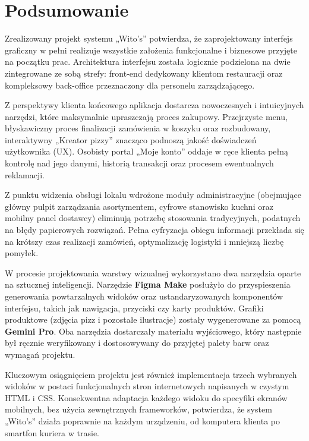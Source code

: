 \chapter{Podsumowanie}

Zrealizowany projekt systemu „Wito’s” potwierdza, że zaprojektowany interfejs graficzny w pełni realizuje wszystkie założenia funkcjonalne i biznesowe przyjęte na początku prac. Architektura interfejsu została logicznie podzielona na dwie zintegrowane ze sobą strefy: front-end dedykowany klientom restauracji oraz kompleksowy back-office przeznaczony dla personelu zarządzającego.
\vspace{5pt}

Z perspektywy klienta końcowego aplikacja dostarcza nowoczesnych i intuicyjnych narzędzi, które maksymalnie upraszczają proces zakupowy. Przejrzyste menu, błyskawiczny proces finalizacji zamówienia w koszyku oraz rozbudowany, interaktywny „Kreator pizzy” znacząco podnoszą jakość doświadczeń użytkownika (UX). Osobisty portal „Moje konto” oddaje w ręce klienta pełną kontrolę nad jego danymi, historią transakcji oraz procesem ewentualnych reklamacji.
\vspace{5pt}

Z punktu widzenia obsługi lokalu wdrożone moduły administracyjne (obejmujące główny pulpit zarządzania asortymentem, cyfrowe stanowisko kuchni oraz mobilny panel dostawcy) eliminują potrzebę stosowania tradycyjnych, podatnych na błędy papierowych rozwiązań. Pełna cyfryzacja obiegu informacji przekłada się na krótszy czas realizacji zamówień, optymalizację logistyki i mniejszą liczbę pomyłek.
\vspace{5pt}

W procesie projektowania warstwy wizualnej wykorzystano dwa narzędzia oparte na sztucznej inteligencji. Narzędzie \textbf{Figma Make} posłużyło do przyspieszenia generowania powtarzalnych widoków oraz ustandaryzowanych komponentów interfejsu, takich jak nawigacja, przyciski czy karty produktów. Grafiki produktowe (zdjęcia pizz i pozostałe ilustracje) zostały wygenerowane za pomocą \textbf{Gemini Pro}. Oba narzędzia dostarczały materiału wyjściowego, który następnie był ręcznie weryfikowany i dostosowywany do przyjętej palety barw oraz wymagań projektu.
\vspace{5pt}

Kluczowym osiągnięciem projektu jest również implementacja trzech wybranych widoków w postaci funkcjonalnych stron internetowych napisanych w czystym HTML i CSS. Konsekwentna adaptacja każdego widoku do specyfiki ekranów mobilnych, bez użycia zewnętrznych frameworków, potwierdza, że system „Wito’s” działa poprawnie na każdym urządzeniu, od komputera klienta po smartfon kuriera w trasie.

